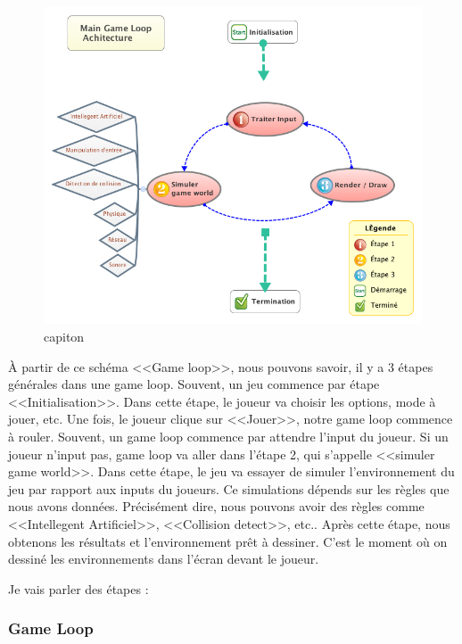 \begin{figure}[htbp]
	\centering
		\includegraphics[width=6in]{XMinds/MainGameLoopAchitecture.png}
	\caption{capiton}
	\label{fig:XMinds_MainGameLoopAchitecture}
\end{figure}

À partir de ce schéma <<Game loop>>, nous pouvons savoir, il y a 3 étapes générales dans une game loop. Souvent, un jeu commence par étape <<Initialisation>>. Dans cette étape, le joueur va choisir les options, mode à jouer, etc. Une fois, le joueur clique sur <<Jouer>>, notre game loop commence à rouler. Souvent, un game loop commence par attendre l'input du joueur. Si un joueur n'input pas, game loop va aller dans l'étape 2, qui s'appelle <<simuler game world>>. Dans cette étape, le jeu va essayer de simuler l'environnement du jeu par rapport aux inputs du joueurs. Ce simulations dépends sur les règles que nous avons données. Précisément dire, nous pouvons avoir des règles comme <<Intellegent Artificiel>>, <<Collision detect>>, etc.. Après cette étape, nous obtenons les résultats et l'environnement prêt à dessiner. C'est le moment où on dessiné les environnements dans l'écran devant le joueur.

Je vais parler des étapes :

\subsubsection{Game Loop} %
\label{ssub:game_loop}

